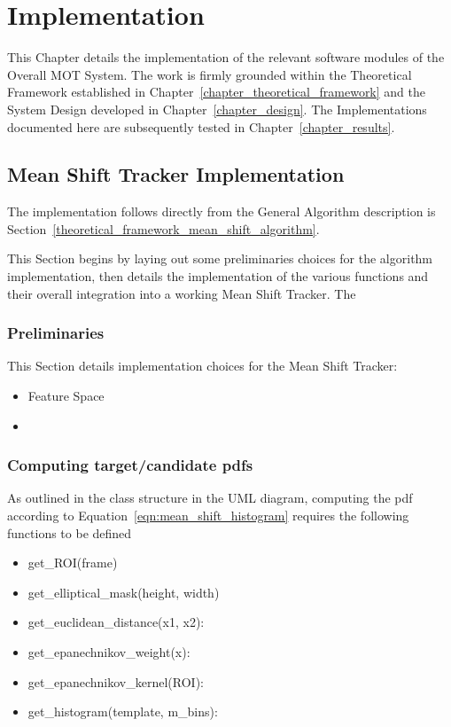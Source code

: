 \chapter{Implementation} \label{chapter_implementation}

This Chapter details the implementation of the relevant software modules of the
Overall MOT System. The work is firmly grounded within the Theoretical Framework
established in Chapter~\ref{chapter_theoretical_framework} and the System Design
developed in Chapter~\ref{chapter_design}. The Implementations documented here
are subsequently tested in Chapter~\ref{chapter_results}.

\section{Mean Shift Tracker Implementation}\label{implementation_mean_shift_tracker}
The implementation follows directly from the General Algorithm description is
Section~\ref{theoretical_framework_mean_shift_algorithm}.

This Section begins by laying out some preliminaries choices for the algorithm
implementation, then details the implementation of the various functions and
their overall integration into a working Mean Shift Tracker. The  

\subsection{Preliminaries}
This Section details implementation choices for the Mean Shift Tracker:
\begin{itemize}
    \item Feature Space
    \item  
\end{itemize}

\subsection{Computing target/candidate pdfs}
As outlined in the class structure in the UML diagram, %
computing the pdf according to Equation~\ref{eqn:mean_shift_histogram} requires the following functions to be
defined

\begin{itemize}
    \item get\_ROI(frame)
    \item get\_elliptical\_mask(height, width)
    \item get\_euclidean\_distance(x1, x2):
    \item get\_epanechnikov\_weight(x):
    \item get\_epanechnikov\_kernel(ROI):
    \item get\_histogram(template, m\_bins): 
\end{itemize}

